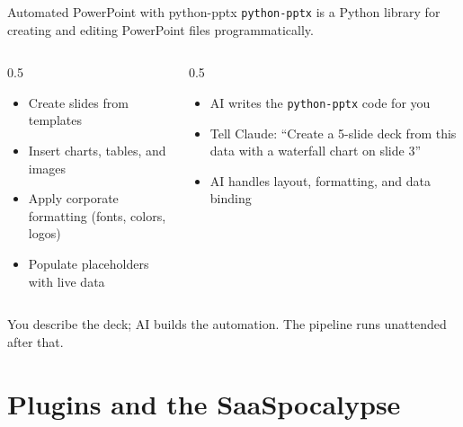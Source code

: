 \documentclass[aspectratio=169]{beamer}
\begin{document}
\begin{frame}[fragile]{Automated PowerPoint with python-pptx}
\texttt{python-pptx} is a Python library for creating and editing PowerPoint files programmatically.
\vspace{0.3cm}
\begin{columns}[T]
\begin{column}{0.5\textwidth}
\begin{shadedbox}[title=\textbf{What It Can Do}]
\begin{itemize}\small
  \item Create slides from templates
  \item Insert charts, tables, and images
  \item Apply corporate formatting (fonts, colors, logos)
  \item Populate placeholders with live data
\end{itemize}
\end{shadedbox}
\end{column}
\begin{column}{0.5\textwidth}
\begin{shadedbox}[title=\textbf{The AI Advantage}]
\begin{itemize}\small
  \item AI writes the \texttt{python-pptx} code for you
  \item Tell Claude: ``Create a 5-slide deck from this data with a waterfall chart on slide 3''
  \item AI handles layout, formatting, and data binding
\end{itemize}
\end{shadedbox}
\end{column}
\end{columns}
\vspace{0.3cm}
\alert{You describe the deck; AI builds the automation.}  The pipeline runs unattended after that.
\end{frame}

\section{Plugins and the SaaSpocalypse}
\end{document}
